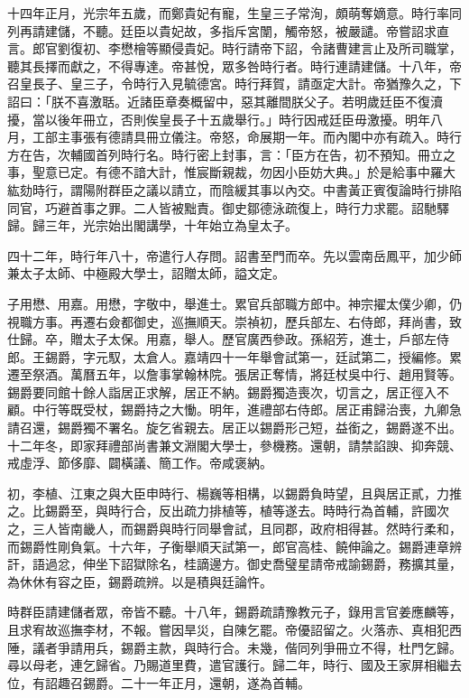 \begin{pinyinscope}
十四年正月，光宗年五歲，而鄭貴妃有寵，生皇三子常洵，頗萌奪嫡意。時行率同列再請建儲，不聽。廷臣以貴妃故，多指斥宮闈，觸帝怒，被嚴譴。帝嘗詔求直言。郎官劉復初、李懋檜等顯侵貴妃。時行請帝下詔，令諸曹建言止及所司職掌，聽其長擇而獻之，不得專達。帝甚悅，眾多咎時行者。時行連請建儲。十八年，帝召皇長子、皇三子，令時行入見毓德宮。時行拜賀，請亟定大計。帝猶豫久之，下詔曰：「朕不喜激聒。近諸臣章奏概留中，惡其離間朕父子。若明歲廷臣不復瀆擾，當以後年冊立，否則俟皇長子十五歲舉行。」時行因戒廷臣毋激擾。明年八月，工部主事張有德請具冊立儀注。帝怒，命展期一年。而內閣中亦有疏入。時行方在告，次輔國首列時行名。時行密上封事，言：「臣方在告，初不預知。冊立之事，聖意已定。有德不諳大計，惟宸斷親裁，勿因小臣妨大典。」於是給事中羅大紘劾時行，謂陽附群臣之議以請立，而陰緩其事以內交。中書黃正賓復論時行排陷同官，巧避首事之罪。二人皆被黜責。御史鄒德泳疏復上，時行力求罷。詔馳驛歸。歸三年，光宗始出閣講學，十年始立為皇太子。

四十二年，時行年八十，帝遣行人存問。詔書至門而卒。先以雲南岳鳳平，加少師兼太子太師、中極殿大學士，詔贈太師，謚文定。

子用懋、用嘉。用懋，字敬中，舉進士。累官兵部職方郎中。神宗擢太僕少卿，仍視職方事。再遷右僉都御史，巡撫順天。崇禎初，歷兵部左、右侍郎，拜尚書，致仕歸。卒，贈太子太保。用嘉，舉人。歷官廣西參政。孫紹芳，進士，戶部左侍郎。王錫爵，字元馭，太倉人。嘉靖四十一年舉會試第一，廷試第二，授編修。累遷至祭酒。萬曆五年，以詹事掌翰林院。張居正奪情，將廷杖吳中行、趙用賢等。錫爵要同館十餘人詣居正求解，居正不納。錫爵獨造喪次，切言之，居正徑入不顧。中行等既受杖，錫爵持之大慟。明年，進禮部右侍郎。居正甫歸治喪，九卿急請召還，錫爵獨不署名。旋乞省親去。居正以錫爵形己短，益銜之，錫爵遂不出。十二年冬，即家拜禮部尚書兼文淵閣大學士，參機務。還朝，請禁諂諛、抑奔競、戒虛浮、節侈靡、闢橫議、簡工作。帝咸褒納。

初，李植、江東之與大臣申時行、楊巍等相構，以錫爵負時望，且與居正貳，力推之。比錫爵至，與時行合，反出疏力排植等，植等遂去。時時行為首輔，許國次之，三人皆南畿人，而錫爵與時行同舉會試，且同郡，政府相得甚。然時行柔和，而錫爵性剛負氣。十六年，子衡舉順天試第一，郎官高桂、饒伸論之。錫爵連章辨訐，語過忿，伸坐下詔獄除名，桂謫邊方。御史喬璧星請帝戒諭錫爵，務擴其量，為休休有容之臣，錫爵疏辨。以是積與廷論忤。

時群臣請建儲者眾，帝皆不聽。十八年，錫爵疏請豫教元子，錄用言官姜應麟等，且求宥故巡撫李材，不報。嘗因旱災，自陳乞罷。帝優詔留之。火落赤、真相犯西陲，議者爭請用兵，錫爵主款，與時行合。未幾，偕同列爭冊立不得，杜門乞歸。尋以母老，連乞歸省。乃賜道里費，遣官護行。歸二年，時行、國及王家屏相繼去位，有詔趣召錫爵。二十一年正月，還朝，遂為首輔。


\end{pinyinscope}
